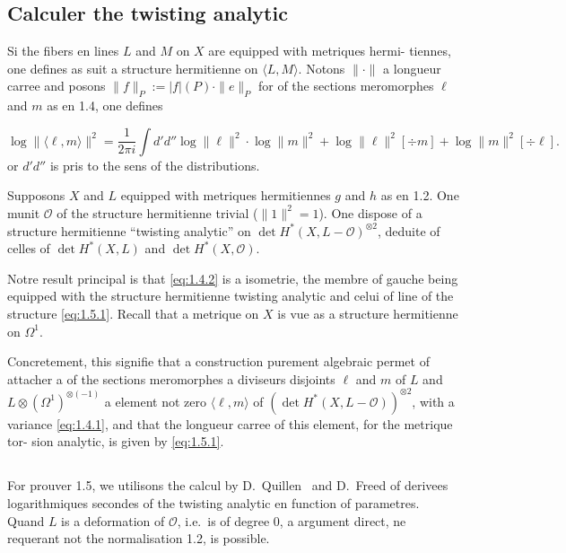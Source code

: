 \documentclass[12pt,a4paper]{article}
\theoremstyle{plain}
\theoremstyle{definition}
\newcommand{\Oo}{\mathscr{O}}
\begin{document}
\subsection{Calculer the twisting analytic}

Si the fibers en lines $L$ and $M$ on $X$ are equipped with metriques hermi-
tiennes, one defines as suit a structure hermitienne on $\langle L, M \rangle$. Notons
$\|\cdot\|$ a longueur carree and posons $\|f\|_P := |f|(P) \cdot \|e\|_P$ for of the sections
meromorphes $\ell$ and $m$ as en 1.4, one defines

\begin{equation}\label{eq:1.5.1}
\log \|\langle \ell, m \rangle\|^2 = \frac{1}{2\pi i} \int d'd'' \log \|\ell\|^2 \cdot \log \|m\|^2 + \log \|\ell\|^2 [\div m] + \log \|m\|^2 [\div \ell] .
\end{equation}
or $d'd''$ is pris to the sens of the distributions.

Supposons $X$ and $L$ equipped with metriques hermitiennes $g$ and $h$ as en
1.2. One munit $\Oo$ of the structure hermitienne trivial ($\|1\|^2 = 1$). One dispose
of a structure hermitienne ``twisting analytic'' on $\det H^*(X, L - \Oo)^{\otimes 2}$, deduite
of celles of $\det H^*(X,L)$ and $\det H^*(X,\Oo)$.

Notre result principal is that \eqref{eq:1.4.2} is a isometrie, the membre of
gauche being equipped with the structure hermitienne twisting analytic and celui of line
of the structure \eqref{eq:1.5.1}. Recall that a metrique on $X$ is vue as a
structure hermitienne on $\Omega^1$.

Concretement, this signifie that a construction purement algebraic permet
of attacher a of the sections meromorphes a diviseurs disjoints $\ell$ and $m$ of $L$
and $L \otimes (\Omega^1)^{\otimes(-1)}$ a element not zero $\langle \ell, m \rangle$ of $(\det H^*(X, L - \Oo))^{\otimes 2}$, with a
variance \eqref{eq:1.4.1}, and that the longueur carree of this element, for the metrique tor-
sion analytic, is given by \eqref{eq:1.5.1}.

\subsection{}

For prouver 1.5, we utilisons the calcul by D.~Quillen~\cite{13} and D.~Freed
\cite{6} of derivees logarithmiques secondes of the twisting analytic en function of
parametres. Quand $L$ is a deformation of $\Oo$, i.e.\ is of degree 0, a argument
direct, ne requerant not the normalisation 1.2, is possible.
\end{document}
